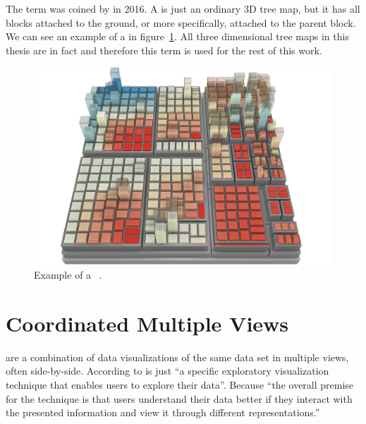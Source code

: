 The term \tmap{} was coined by \textcite{Limberger2016} in 2016.
A \tmap{} is just an ordinary 3D tree map, but it has all blocks attached to the ground, or more specifically, attached to the parent block.
We can see an example of a \tmap{} in figure~\ref{fig:research:ua_treemap}.
All three dimensional tree maps in this thesis are in fact \tmaps{} and therefore this term is used for the rest of this work.

\begin{figure}[ht]
  \centering
  \includegraphics[width=\textwidth]{figures/related-work/2_5D_treemap_example}
  \caption{Example of a \tmap{}~\parencite{Doellner2017}.}
  \label{fig:research:ua_treemap}
\end{figure}


\section{Coordinated Multiple Views}\label{sec:related-work:cmvs}
\cmvs{} are a combination of data visualizations of the same data set in multiple views, often side-by-side.
According to \textcite{Roberts2007} \cmvs{} is just ``a specific exploratory visualization technique that enables users to explore their data''.
Because ``the overall premise for the technique is that users understand their data better if they interact with the presented information and view it through different representations.''~\parencite{Roberts2007}

